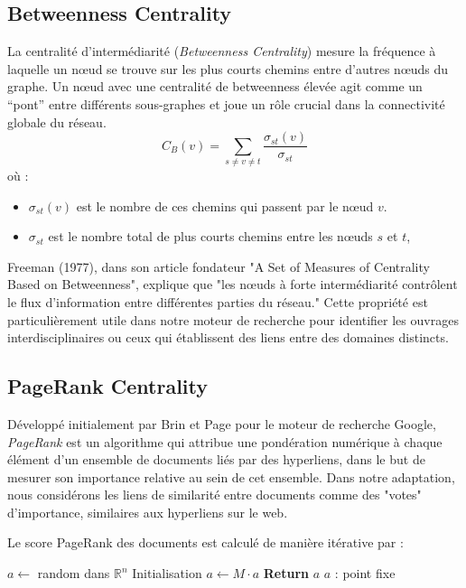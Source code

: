 \documentclass{article}
\begin{document}
    \subsection{ Betweenness Centrality }
    La centralité d'intermédiarité (\textit{Betweenness Centrality}) mesure la fréquence à laquelle un nœud se trouve sur les plus courts chemins entre d'autres nœuds du graphe. Un nœud avec une centralité de betweenness élevée agit comme un “pont” entre différents sous-graphes et joue un rôle crucial dans la connectivité globale du réseau.
    \[
        C_B(v) = \sum_{s \neq v \neq t} \frac{\sigma_{st}(v)}{\sigma_{st}}
    \]
    où :
    \begin{itemize}
        \item $\sigma_{st}(v)$ est le nombre de ces chemins qui passent par le nœud $v$.
        \item $\sigma_{st}$ est le nombre total de plus courts chemins entre les nœuds $s$ et  $t$,
    \end{itemize}
    Freeman (1977)\cite{freeman1977set}, dans son article fondateur "A Set of Measures of Centrality Based on Betweenness", explique que "les nœuds à forte intermédiarité contrôlent le flux d'information entre différentes parties du réseau."  Cette propriété est particulièrement utile dans notre moteur de recherche pour identifier les ouvrages interdisciplinaires ou ceux qui établissent des liens entre des domaines distincts.

    \subsection{ PageRank Centrality }
    Développé initialement par Brin et Page pour le moteur de recherche Google\cite{brin1998anatomy}, \textit{PageRank} est un algorithme qui attribue une pondération numérique à chaque élément d'un ensemble de documents liés par des hyperliens, dans le but de mesurer son importance relative au sein de cet ensemble. Dans notre adaptation, nous considérons les liens de similarité entre documents comme des "votes" d'importance, similaires aux hyperliens sur le web.

    Le score PageRank des documents est calculé de manière itérative par :

    \begin{algorithm}[H]
        \caption{PageRank avec condition d'arrêt basée sur la norme}
        \begin{algorithmic}
        \State $a \gets$ random dans $\mathbb{R}^n$ \Comment Initialisation
            \State $a \gets M \cdot a$  
        \EndWhile
        \State \textbf{Return} $a$  \Comment $a$ : point fixe
        \end{algorithmic}
        \end{algorithm}
\end{document}
